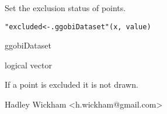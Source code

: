 \begin{Description}\relax
Set the exclusion status of points.
\end{Description}
\begin{Usage}
\begin{verbatim}"excluded<-.ggobiDataset"(x, value)\end{verbatim}
\end{Usage}
\begin{Arguments}
\begin{ldescription}
\item[\code{x}] ggobiDataset
\item[\code{value}] logical vector
\end{ldescription}
\end{Arguments}
\begin{Details}\relax
If a point is excluded it is not drawn.
\end{Details}
\begin{Author}\relax
Hadley Wickham <h.wickham@gmail.com>
\end{Author}
\begin{SeeAlso}\relax
{}
\end{SeeAlso}
\begin{Examples}
\begin{ExampleCode}\end{ExampleCode}
\end{Examples}


